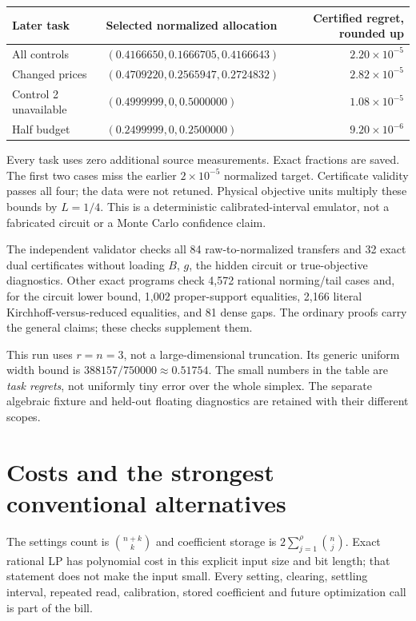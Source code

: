 \documentclass[10pt,a4paper]{article}
\begin{document}
\begin{center}\small
\begin{tabular}{p{34mm}p{57mm}r}
\toprule
Later task & Selected normalized allocation & Certified regret, rounded up\\
\midrule
All controls & $(0.4166650,0.1666705,0.4166643)$ & $2.20\times10^{-5}$\\
Changed prices & $(0.4709220,0.2565947,0.2724832)$ & $2.82\times10^{-5}$\\
Control 2 unavailable & $(0.4999999,0,0.5000000)$ & $1.08\times10^{-5}$\\
Half budget & $(0.2499999,0,0.2500000)$ & $9.20\times10^{-6}$\\
\bottomrule
\end{tabular}
\end{center}
Every task uses zero additional source measurements. Exact fractions are saved.
The first two cases miss the earlier $2\times10^{-5}$ normalized target.
Certificate validity passes all four; the data were not retuned. Physical
objective units multiply these bounds by $L=1/4$. This is a deterministic
calibrated-interval emulator, not a fabricated circuit or a Monte Carlo
confidence claim.

The independent validator checks all 84 raw-to-normalized transfers and 32 exact
dual certificates without loading $B$, $g$, the hidden circuit or true-objective
diagnostics. Other exact programs check 4,572 rational norming/tail cases and,
for the circuit lower bound, 1,002 proper-support equalities, 2,166 literal
Kirchhoff-versus-reduced equalities, and 81 dense gaps. The ordinary proofs carry
the general claims; these checks supplement them.

This run uses $r=n=3$, not a large-dimensional truncation. Its generic uniform
width bound is $388157/750000\approx0.51754$. The small numbers in the table
are \emph{task regrets}, not uniformly tiny error over the whole simplex.
The separate algebraic fixture and held-out floating diagnostics are retained
with their different scopes.

\section{Costs and the strongest conventional alternatives}

The settings count is $\binom{n+k}{k}$ and coefficient storage is
$2\sum_{j=1}^{\rho}\binom nj$. Exact rational LP has polynomial cost in this
explicit input size and bit length; that statement does not make the input
small. Every setting, clearing, settling interval, repeated read, calibration,
stored coefficient and future optimization call is part of the bill.
\end{document}
